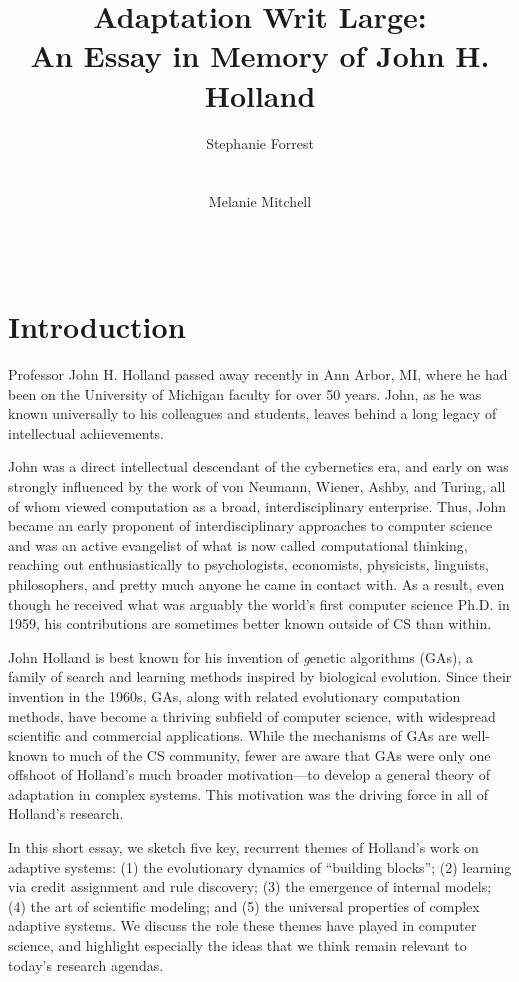 \documentclass{sig-alternate}
\title{Adaptation Writ Large:\\ An Essay in Memory of John H. Holland}
\author 
{\alignauthor
 Stephanie Forrest\\
 \affaddr{University of New Mexico}\\
 \affaddr{Santa Fe Institute}\\
 \email{forrest@cs.unm.edu}
 \alignauthor
Melanie Mitchell \\
 \affaddr{Portland State University}\\
 \affaddr{Santa Fe Institute}\\
 \email{mm@pdx.edu}
}
\begin{document}
\maketitle

% 

\section{Introduction}

Professor John H. Holland passed away recently in Ann Arbor, MI, where
he had been on the University of Michigan faculty for over 50 years.
John, as he was known universally to his colleagues and students,
leaves behind a long legacy of intellectual achievements.  

John was a direct intellectual descendant of the cybernetics era, and
early on was strongly influenced by the work of von Neumann, Wiener,
Ashby, and Turing, all of whom viewed computation as a broad,
interdisciplinary enterprise.  Thus, John became an early proponent of
interdisciplinary approaches to computer science and was an active
evangelist of what is now called {\emph computational thinking}, reaching out
enthusiastically to psychologists, economists, physicists, linguists,
philosophers, and pretty much anyone he came in contact with.  As a
result, even though he received what was arguably the world's first
computer science Ph.D. in 1959, his contributions are sometimes better known
outside of CS than within.

John Holland is best known for his invention of {\emph genetic
  algorithms} (GAs), a family of search and learning methods inspired
by biological evolution.  Since their invention in the 1960s, GAs,
along with related evolutionary computation methods, have become a
thriving subfield of computer science, with widespread scientific and
commercial applications.  While the mechanisms of GAs are well-known
to much of the CS community, fewer are aware that GAs were only one
offshoot of Holland's much broader motivation---to develop a general
theory of adaptation in complex systems.  This motivation was the
driving force in all of Holland's research.   

In this short essay, we sketch five key, recurrent themes of Holland's
work on adaptive systems: (1) the evolutionary dynamics of ``building
blocks''; (2) learning via credit assignment and rule discovery; (3)
the emergence of internal models; (4) the art of scientific modeling;
and (5) the universal properties of complex adaptive systems.  We
discuss the role these themes have played in computer science, and
highlight especially the ideas that we think remain relevant to
today's research agendas.
\end{document}
